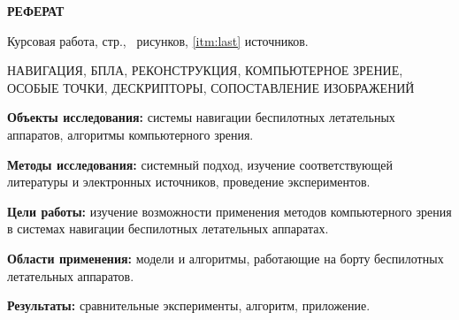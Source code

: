 \begin{center}
  \large\bfseries{РЕФЕРАТ}
\end{center}

Курсовая работа, \pageref{LastPage} стр., \totalfigures\ рисунков, \ref{itm:last} источников.

\begin{center}
  \large{НАВИГАЦИЯ, БПЛА, РЕКОНСТРУКЦИЯ, КОМПЬЮТЕРНОЕ ЗРЕНИЕ, ОСОБЫЕ ТОЧКИ, ДЕСКРИПТОРЫ, СОПОСТАВЛЕНИЕ ИЗОБРАЖЕНИЙ}
\end{center}

\textbf{Объекты исследования:} системы навигации беспилотных летательных аппаратов, алгоритмы компьютерного зрения.

\textbf{Методы исследования:} системный подход, изучение соответствующей литературы и электронных источников, проведение экспериментов.

\textbf{Цели работы:} изучение возможности применения методов компьютерного зрения в системах навигации беспилотных летательных аппаратах.

\textbf{Области применения:} модели и алгоритмы, работающие на борту беспилотных летательных аппаратов.

\textbf{Результаты:} сравнительные эксперименты, алгоритм, приложение. 

\newpage